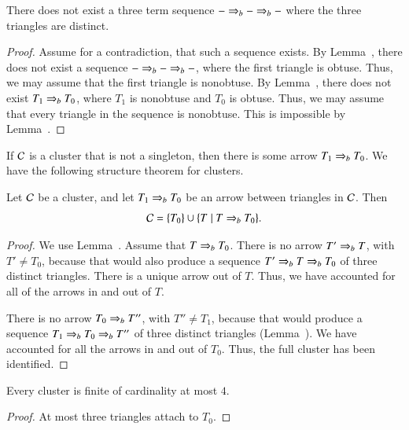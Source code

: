 \begin{lemma}  There does not exist a three
  term sequence $- \Rightarrow_{b} -\Rightarrow_{b} -$ where the three triangles are
  distinct.
\end{lemma}

\begin{proof}  
  Assume for a contradiction, that such a sequence exists.  By
  Lemma~, there does not exist a sequence $- \Rightarrow_{b} -
  \Rightarrow_{b} -$, where the first triangle is obtuse.  Thus, we may assume
  that the first triangle is nonobtuse.  By Lemma~,
  there does not exist $T_1\Rightarrow_{b} T_0$, where $T_1$ is nonobtuse and
  $T_0$ is obtuse.  Thus, we may assume that every triangle in the
  sequence is nonobtuse.  This is impossible by
  Lemma~.
\end{proof}

If $\mathcal C$ is a cluster that is not a singleton, then there is
some arrow $T_1\Rightarrow_{b} T_0$.  We have the following structure
theorem for clusters.

\begin{theorem}
  Let $\mathcal C$ be a cluster, and let $T_1\Rightarrow_{b} T_0$ be an
  arrow between triangles in $\mathcal C$.
  Then 
  \begin{equation}\libel{eqn:c-weak}
  \C = \{T_0\}\cup \{T \mid T\rab T_0\}.
  \end{equation}
\end{theorem}

\begin{proof}  
  We use Lemma~.  Assume that $T\Rightarrow_{b} T_0$.  There
  is no arrow $T'\Rightarrow_{b} T$, with $T'\ne T_0$, because that would also
  produce a sequence $T' \Rightarrow_{b} T \Rightarrow_{b} T_0$ of three distinct triangles.
  There is a unique arrow out of $T$.  Thus, we have accounted for all
  of the arrows in and out of $T$.

  There is no arrow $T_0\Rightarrow_{b} T''$, with $T''\ne T_1$, because that
  would produce a sequence $T_1\Rightarrow_{b} T_0\Rightarrow_{b} T''$ of  three 
  distinct triangles (Lemma~).  We have accounted for all the arrows in and
  out of $T_0$.  Thus, the full cluster has been identified.
\end{proof}

\begin{corollary}
  Every cluster is finite of cardinality at most $4$.
\end{corollary}

\begin{proof} At most three triangles attach to $T_0$.
\end{proof}

